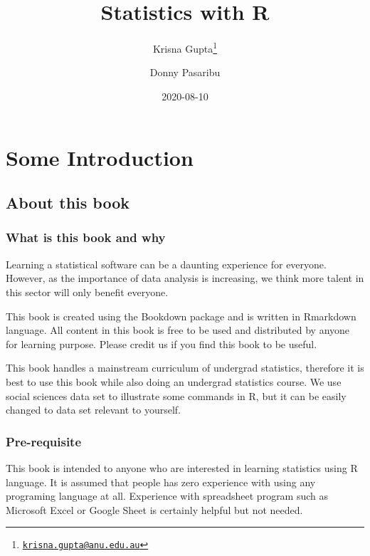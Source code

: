 \documentclass[
]{book}
\title{Statistics with R}
\author{Krisna Gupta\footnote{\href{mailto:krisna.gupta@anu.edu.au}{\nolinkurl{krisna.gupta@anu.edu.au}}} \and Donny Pasaribu}
\date{2020-08-10}
\begin{document}
\maketitle

{
\setcounter{tocdepth}{1}
\tableofcontents
}
\hypertarget{some-introduction}{%
\chapter{Some Introduction}\label{some-introduction}}

\hypertarget{about-this-book}{%
\section{About this book}\label{about-this-book}}

\hypertarget{what-is-this-book-and-why}{%
\subsection{What is this book and why}\label{what-is-this-book-and-why}}

Learning a statistical software can be a daunting experience for everyone. However, as the importance of data analysis is increasing, we think more talent in this sector will only benefit everyone.

This book is created using the Bookdown \citep{R-bookdown} package and is written in Rmarkdown \citep{R-rmarkdown} language. All content in this book is free to be used and distributed by anyone for learning purpose. Please credit us if you find this book to be useful.

This book handles a mainstream curriculum of undergrad statistics, therefore it is best to use this book while also doing an undergrad statistics course. We use social sciences data set to illustrate some commands in R, but it can be easily changed to data set relevant to yourself.

\hypertarget{pre-requisite}{%
\subsection{Pre-requisite}\label{pre-requisite}}

This book is intended to anyone who are interested in learning statistics using R language. It is assumed that people has zero experience with using any programing language at all. Experience with spreadsheet program such as Microsoft Excel or Google Sheet is certainly helpful but not needed.
\end{document}
